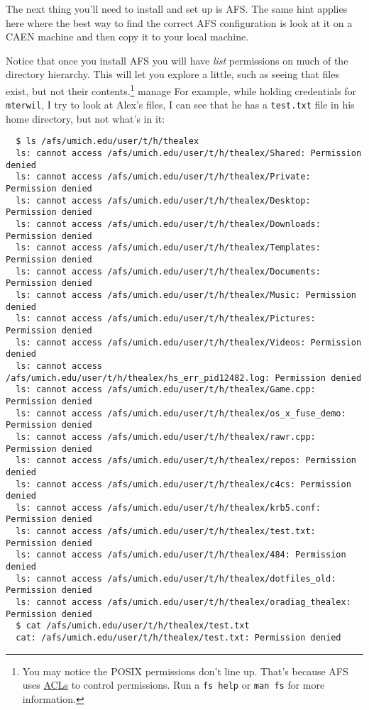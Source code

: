 \documentclass{article}
\begin{document}
The next thing you'll need to install and set up is AFS. The same hint applies
here where the best way to find the correct AFS configuration is look at it on
a CAEN machine and then copy it to your local machine.

Notice that once you install AFS you will have \emph{list} permissions on much
of the directory hierarchy. This will let you explore a little, such as seeing
that files exist, but not their contents.\footnote{You may notice the POSIX
permissions don't line up. That's because AFS uses
\href{https://web.njit.edu/info/afs.perms.html}{ACLs} to control permissions.
Run a \texttt{fs help} or \texttt{man fs} for more information. }
manage  For example, while holding credentials for \texttt{mterwil}, I try to
look at Alex's files, I can see that he has a \texttt{test.txt} file in his home
directory, but not what's in it:

\begin{lstlisting}
  $ ls /afs/umich.edu/user/t/h/thealex
  ls: cannot access /afs/umich.edu/user/t/h/thealex/Shared: Permission denied
  ls: cannot access /afs/umich.edu/user/t/h/thealex/Private: Permission denied
  ls: cannot access /afs/umich.edu/user/t/h/thealex/Desktop: Permission denied
  ls: cannot access /afs/umich.edu/user/t/h/thealex/Downloads: Permission denied
  ls: cannot access /afs/umich.edu/user/t/h/thealex/Templates: Permission denied
  ls: cannot access /afs/umich.edu/user/t/h/thealex/Documents: Permission denied
  ls: cannot access /afs/umich.edu/user/t/h/thealex/Music: Permission denied
  ls: cannot access /afs/umich.edu/user/t/h/thealex/Pictures: Permission denied
  ls: cannot access /afs/umich.edu/user/t/h/thealex/Videos: Permission denied
  ls: cannot access /afs/umich.edu/user/t/h/thealex/hs_err_pid12482.log: Permission denied
  ls: cannot access /afs/umich.edu/user/t/h/thealex/Game.cpp: Permission denied
  ls: cannot access /afs/umich.edu/user/t/h/thealex/os_x_fuse_demo: Permission denied
  ls: cannot access /afs/umich.edu/user/t/h/thealex/rawr.cpp: Permission denied
  ls: cannot access /afs/umich.edu/user/t/h/thealex/repos: Permission denied
  ls: cannot access /afs/umich.edu/user/t/h/thealex/c4cs: Permission denied
  ls: cannot access /afs/umich.edu/user/t/h/thealex/krb5.conf: Permission denied
  ls: cannot access /afs/umich.edu/user/t/h/thealex/test.txt: Permission denied
  ls: cannot access /afs/umich.edu/user/t/h/thealex/484: Permission denied
  ls: cannot access /afs/umich.edu/user/t/h/thealex/dotfiles_old: Permission denied
  ls: cannot access /afs/umich.edu/user/t/h/thealex/oradiag_thealex: Permission denied
  $ cat /afs/umich.edu/user/t/h/thealex/test.txt
  cat: /afs/umich.edu/user/t/h/thealex/test.txt: Permission denied
\end{lstlisting}
\end{document}
